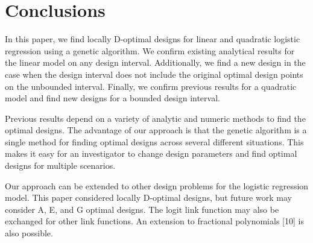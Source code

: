 \documentclass[11pt,a4paper]{article}
\begin{document}
\section{Conclusions}
In this paper, we find locally D-optimal designs for linear and quadratic logistic regression using a genetic algorithm. We confirm existing analytical results for the linear model on any design interval. Additionally, we find a new design in the case when the design interval does not include the original optimal design points on the unbounded interval. Finally, we confirm previous results for a quadratic model and find new designs for a bounded design interval.

 Previous results depend on a variety of analytic and numeric methods to find the optimal designs. The advantage of our approach is that the genetic algorithm is a single method for finding optimal designs across several different situations. This makes it easy for an investigator to change design parameters and find optimal designs for multiple scenarios.
 
Our approach can be extended to other design problems for the logistic regression model. This paper considered locally D-optimal designs, but future work may consider A, E, and G optimal designs. The logit link function may also be exchanged for other link functions. An extension to fractional polynomials [10] is also possible.
 
\newpage
\end{document}
